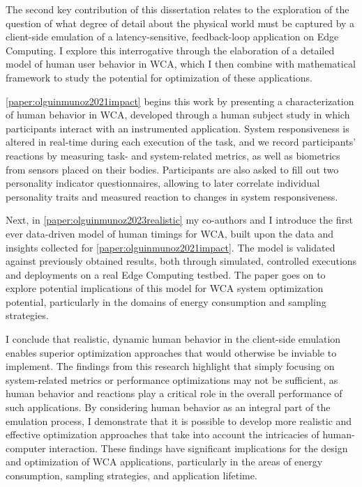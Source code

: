 \medskip

The second key contribution of this dissertation relates to the exploration of the question of what degree of detail about the physical world must be captured by a client-side emulation of a latency-sensitive, feedback-loop application on Edge Computing.
I explore this interrogative through the elaboration of a detailed model of human user behavior in \gls{WCA}, which I then combine with mathematical framework to study the potential for optimization of these applications.

\cref{paper:olguinmunoz2021impact} begins this work by presenting a characterization of human behavior in \gls{WCA}, developed through a human subject study in which participants interact with an instrumented application.
System responsiveness is altered in real-time during each execution of the task, and we record participants' reactions by measuring task- and system-related metrics, as well as biometrics from sensors placed on their bodies.
Participants are also asked to fill out two personality indicator questionnaires, allowing to later correlate individual personality traits and measured reaction to changes in system responsiveness.

Next, in \cref{paper:olguinmunoz2023realistic} my co-authors and I introduce the first ever data-driven model of human timings for \gls{WCA}, built upon the data and insights collected for \cref{paper:olguinmunoz2021impact}.
The model is validated against previously obtained results, both through simulated, controlled executions and deployments on a real Edge Computing testbed.
The paper goes on to explore potential implications of this model for \gls{WCA} system optimization potential, particularly in the domains of energy consumption and sampling strategies.

I conclude that realistic, dynamic human behavior in the client-side emulation enables superior optimization approaches that would otherwise be inviable to implement.
The findings from this research highlight that simply focusing on system-related metrics or performance optimizations may not be sufficient, as human behavior and reactions play a critical role in the overall performance of such applications.
By considering human behavior as an integral part of the emulation process, I demonstrate that it is possible to develop more realistic and effective optimization approaches that take into account the intricacies of human-computer interaction.
These findings have significant implications for the design and optimization of \gls{WCA} applications, particularly in the areas of energy consumption, sampling strategies, and application lifetime.

